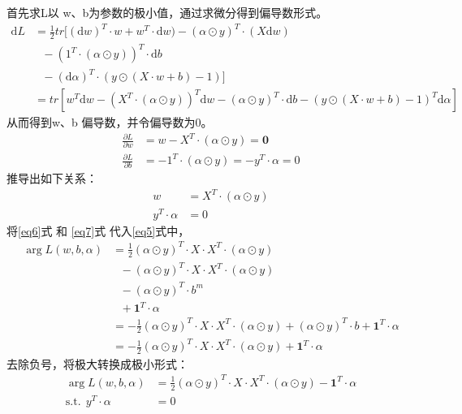 \documentclass[12pt, a4paper, oneside]{ctexart}
\begin{document}
首先求L以 w、b为参数的极小值，通过求微分得到偏导数形式。
\begin{align}
    \mathrm{d}L &= \frac{1}{2}tr[(\mathrm{d}w)^T \cdot w + w^T \cdot \mathrm{d}w) - (\alpha \odot y) ^T \cdot(X\mathrm{d}w) \nonumber \\
                & \ \ \  - (1^T\cdot(\alpha \odot y)) ^T \cdot \mathrm{d}b \nonumber\\
                & \ \ \  - (\mathrm{d}\alpha)^T \cdot (y \odot (X \cdot w + b) - 1)] \nonumber \\
                &= tr[w^T\mathrm{d}w - (X^T\cdot(\alpha \odot y))^T\mathrm{d}w - (\alpha \odot y) ^T \cdot \mathrm{d}b - (y \odot (X \cdot w + b) - 1)^T\mathrm{d}\alpha] \nonumber
\end{align}
从而得到w、b 偏导数，并令偏导数为0。
\begin{align}
    \frac{\partial L}{\partial w} &= w - X^T\cdot(\alpha \odot y) = \boldsymbol{0} \nonumber \\
    \frac{\partial L}{\partial b} &= - 1^T\cdot(\alpha \odot y) = - y^T \cdot \alpha = 0  \nonumber
\end{align}
推导出如下关系：
\begin{align}
    w &= X^T\cdot(\alpha \odot y) \label{eq6} \\
    y^T \cdot \alpha &= 0 \label{eq7}
\end{align}
将\eqref{eq6}式 和 \eqref{eq7}式 代入\eqref{eq5}式中，
\begin{align}
    \mathop{\arg\max_{\alpha}} L(w, b, {\alpha}) &= \frac{1}{2}(\alpha \odot y)^T \cdot X \cdot X^T \cdot (\alpha \odot y) \nonumber \\
                      & \ \ \  - (\alpha \odot y)^T \cdot X \cdot X^T \cdot (\alpha \odot y) \nonumber \\
                      & \ \ \  - (\alpha \odot y)^T \cdot b^m  \nonumber \\
                      & \ \ \  + \boldsymbol{1}^T\cdot\alpha  \nonumber \\
                      &= -\frac{1}{2}(\alpha \odot y)^T \cdot X \cdot X^T \cdot (\alpha \odot y) + (\alpha \odot y)^T \cdot b + \boldsymbol{1}^T\cdot\alpha \nonumber \\
                      &= -\frac{1}{2}(\alpha \odot y)^T \cdot X \cdot X^T \cdot (\alpha \odot y) + \boldsymbol{1}^T\cdot\alpha \nonumber 
\end{align}
去除负号，将极大转换成极小形式：
\begin{align}
    \mathop{\arg\min_{\alpha}} L(w, b, {\alpha}) &= \frac{1}{2}(\alpha \odot y)^T \cdot X \cdot X^T \cdot (\alpha \odot y) - \boldsymbol{1}^T\cdot\alpha \label{eq8} \\
        \mathrm{ s.t. }\ \   y^T \cdot \alpha &= 0 \nonumber 
\end{align}
\end{document}
